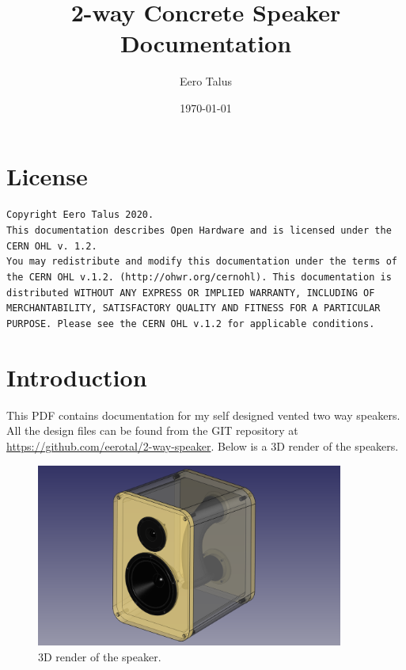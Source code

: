 \documentclass[10pt]{article}
\title{2-way Concrete Speaker Documentation}
\author{Eero Talus}
\date{\today}
\begin{document}
\maketitle
\tableofcontents

\section{License}

\begin{sloppypar}
\noindent
\texttt{Copyright Eero Talus 2020.}\\

\noindent
\texttt{This documentation describes Open Hardware and is licensed under the
CERN OHL v. 1.2.}\\

\noindent
\texttt{You may redistribute and modify this documentation under the terms of
the CERN OHL v.1.2. (http://ohwr.org/cernohl). This documentation is distributed
WITHOUT ANY EXPRESS OR IMPLIED WARRANTY, INCLUDING OF MERCHANTABILITY,
SATISFACTORY QUALITY AND FITNESS FOR A PARTICULAR PURPOSE. Please see the
CERN OHL v.1.2 for applicable conditions.}
\end{sloppypar}

\section{Introduction}

\noindent This PDF contains documentation for my self designed vented two way
speakers. All the design files can be found from the GIT repository at
\url{https://github.com/eerotal/2-way-speaker}. Below is a 3D render of the
speakers.\\

\begin{figure}[htp]
	\centering
	\includegraphics[width=0.9\textwidth]{../drawings/render.png}
	\caption{3D render of the speaker.}
\end{figure}
\end{document}
